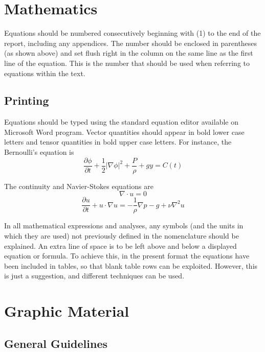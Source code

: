 \documentclass{stabs21}
\begin{document}
\begin{multicols}{2}
[...]

\section{Mathematics}

Equations should be numbered consecutively beginning with (1) to the
end of the report, including any appendices. The number should be
enclosed in parentheses (as shown above) and set flush right in the
column on the same line as the first line of the equation. This is the
number that should be used when referring to equations within the
text.

\subsection{Printing}

Equations should be typed using the standard equation editor
available on Microsoft Word program. Vector quantities should appear
in bold lower case letters and tensor quantities in bold upper case
letters. For instance, the Bernoulli’s equation is
\begin{equation}
  \frac{\partial\phi}{\partial t} + \frac12 |\nabla \phi|^2 + \frac P\rho + gy = C(t)
\end{equation}

The continuity and Navier-Stokes equations are
\begin{equation}
  \nabla\cdot u = 0
\end{equation}
\begin{equation}
  \frac{\partial u}{\partial t} + u\cdot \nabla u = -\frac1\rho \nabla p - g + \nu \nabla^2 u
\end{equation}

In all mathematical expressions and analyses, any symbols (and the
units in which they are used) not previously defined in the
nomenclature should be explained. An extra line of space is to be
left above and below a displayed equation or formula. To achieve this,
in the present format the equations have been included in tables, so
that blank table rows can be exploited. However, this is just a
suggestion, and different techniques can be used.

\section{Graphic Material}

\subsection{General Guidelines}


\end{multicols}
\end{document}
